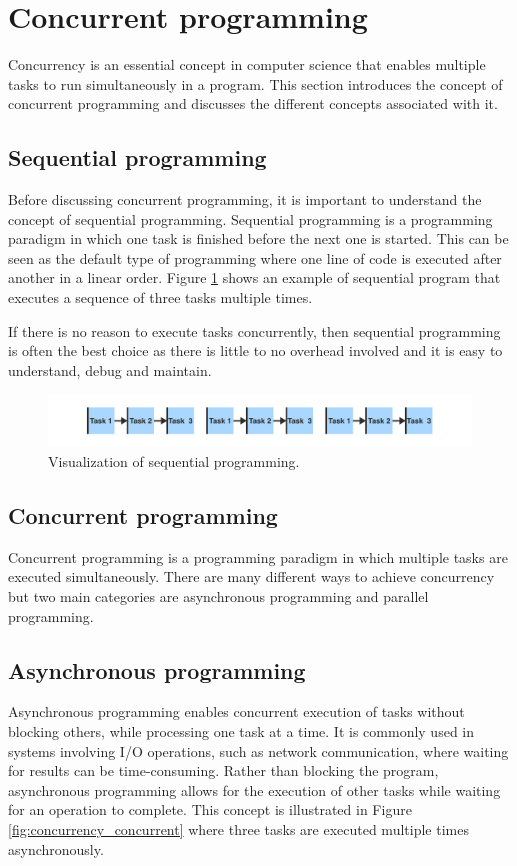 \section{Concurrent programming}
Concurrency is an essential concept in computer science that enables multiple tasks to run simultaneously in a program.
This section introduces the concept of concurrent programming and discusses the different concepts associated with it.

\subsection{Sequential programming}
Before discussing concurrent programming, it is important to understand the concept of sequential programming.
Sequential programming is a programming paradigm in which one task is finished before the next one is started.
This can be seen as the default type of programming where one line of code is executed after another in a linear order.
Figure \ref{fig:concurrency_sequential} shows an example of sequential program that executes a sequence of three tasks multiple times.

If there is no reason to execute tasks concurrently, then sequential programming is often the best choice as there is little to no overhead involved and it is easy to understand, debug and maintain.

\begin{figure}[H]
    \centering
    \includegraphics[width=\textwidth]{figures/concurrency/sequential.pdf}
    \caption{Visualization of sequential programming.}
    \label{fig:concurrency_sequential}
\end{figure}


\subsection{Concurrent programming}
Concurrent programming is a programming paradigm in which multiple tasks are executed simultaneously.
There are many different ways to achieve concurrency but two main  categories are asynchronous programming and parallel programming.


\subsection{Asynchronous programming}
Asynchronous programming enables concurrent execution of tasks without blocking others, while processing one task at a time.
It is commonly used in systems involving I/O operations, such as network communication, where waiting for results can be time-consuming.
Rather than blocking the program, asynchronous programming allows for the execution of other tasks while waiting for an operation to complete.
This concept is illustrated in Figure \ref{fig:concurrency_concurrent} where three tasks are executed multiple times asynchronously.

